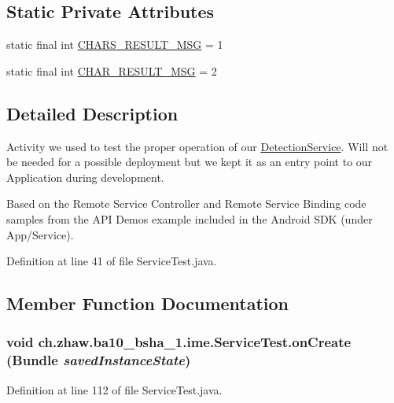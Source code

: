 \subsection*{Static Private Attributes}
\begin{DoxyCompactItemize}
\item 
static final int \hyperlink{classch_1_1zhaw_1_1ba10__bsha__1_1_1ime_1_1ServiceTest_ac1d59d2fe1c01777f19b3c9bdf279f4f}{CHARS\_\-RESULT\_\-MSG} = 1
\item 
static final int \hyperlink{classch_1_1zhaw_1_1ba10__bsha__1_1_1ime_1_1ServiceTest_af5742511ec4008834a2d1354102ce616}{CHAR\_\-RESULT\_\-MSG} = 2
\end{DoxyCompactItemize}


\subsection{Detailed Description}
Activity we used to test the proper operation of our \hyperlink{}{DetectionService}. Will not be needed for a possible deployment but we kept it as an entry point to our Application during development.

Based on the Remote Service Controller and Remote Service Binding code samples from the API Demos example included in the Android SDK (under App/Service). 

Definition at line 41 of file ServiceTest.java.

\subsection{Member Function Documentation}
\hypertarget{classch_1_1zhaw_1_1ba10__bsha__1_1_1ime_1_1ServiceTest_a26ed9a2164e8ed852c0755ed175c3805}{
\subsubsection[{onCreate}]{\setlength{\rightskip}{0pt plus 5cm}void ch.zhaw.ba10\_\-bsha\_\-1.ime.ServiceTest.onCreate (Bundle {\em savedInstanceState})}}
\label{classch_1_1zhaw_1_1ba10__bsha__1_1_1ime_1_1ServiceTest_a26ed9a2164e8ed852c0755ed175c3805}


Definition at line 112 of file ServiceTest.java.

